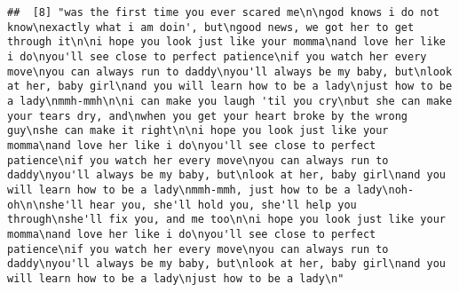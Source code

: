 \documentclass[]{article}
\begin{document}
\begin{verbatim}
##  [8] "was the first time you ever scared me\n\ngod knows i do not know\nexactly what i am doin', but\ngood news, we got her to get through it\n\ni hope you look just like your momma\nand love her like i do\nyou'll see close to perfect patience\nif you watch her every move\nyou can always run to daddy\nyou'll always be my baby, but\nlook at her, baby girl\nand you will learn how to be a lady\njust how to be a lady\nmmh-mmh\n\ni can make you laugh 'til you cry\nbut she can make your tears dry, and\nwhen you get your heart broke by the wrong guy\nshe can make it right\n\ni hope you look just like your momma\nand love her like i do\nyou'll see close to perfect patience\nif you watch her every move\nyou can always run to daddy\nyou'll always be my baby, but\nlook at her, baby girl\nand you will learn how to be a lady\nmmh-mmh, just how to be a lady\noh-oh\n\nshe'll hear you, she'll hold you, she'll help you through\nshe'll fix you, and me too\n\ni hope you look just like your momma\nand love her like i do\nyou'll see close to perfect patience\nif you watch her every move\nyou can always run to daddy\nyou'll always be my baby, but\nlook at her, baby girl\nand you will learn how to be a lady\njust how to be a lady\n"                                                                                                                                                                                                                                                                                                                                                                                                                                                                                                                                                                                                                                                                                                                                                                                                                                                                                                                                                                                                                                                                                                                                                                                                                                                                                                                                                                                                                                                                                                                                                                                                                                                                                                           

\end{verbatim}
\end{document}
